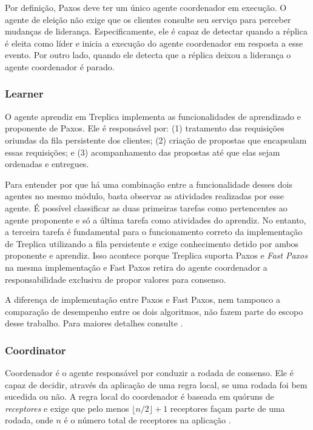 Por definição, Paxos deve ter um único agente coordenador em execução. O agente de eleição
não exige que os clientes consulte seu serviço para perceber mudanças de liderança.
Especificamente, ele é capaz de detectar quando a réplica é eleita como líder e inicia a
execução do agente coordenador em resposta a esse evento. Por outro lado, quando ele
detecta que a réplica deixou a liderança o agente coordenador é parado.

\subsubsection{Learner}

O agente aprendiz em Treplica implementa as funcionalidades de aprendizado e proponente de
Paxos. Ele é responsável por: (1) tratamento das requisições oriundas da fila persistente
dos clientes; (2) criação de propostas que encapsulam essas requisições; e (3)
acompanhamento das propostas até que elas sejam ordenadas e entregues.

Para entender por que há uma combinação entre a funcionalidade desses dois agentes no
mesmo módulo, basta observar as atividades realizadas por esse agente. É possível
classificar as duas primeiras tarefas como pertencentes ao agente proponente e só a última
tarefa como atividades do aprendiz. No entanto, a terceira tarefa é fundamental para
o funcionamento correto da implementação de Treplica utilizando a fila persistente e exige
conhecimento detido por ambos proponente e aprendiz. Isso acontece porque Treplica
suporta Paxos e \emph{Fast Paxos} \cite{lamport06a} na mesma implementação e Fast Paxos
retira do agente coordenador a responsabilidade exclusiva de propor valores para consenso.

A diferença de implementação entre Paxos e Fast Paxos, nem tampouco a comparação de
desempenho entre os dois algoritmos, não fazem parte do escopo desse trabalho. Para
maiores detalhes consulte .

\subsubsection{Coordinator}

Coordenador é o agente responsável por conduzir a rodada de consenso. Ele é capaz de
decidir, através da aplicação de uma regra local, se uma rodada foi bem sucedida ou não. A
regra local do coordenador é baseada em quóruns de \emph{receptores} e exige que pelo
menos $\lfloor n/2 \rfloor + 1$ receptores façam parte de uma rodada, onde $n$ é o número
total de receptores na aplicação \cite{lamport98}.

